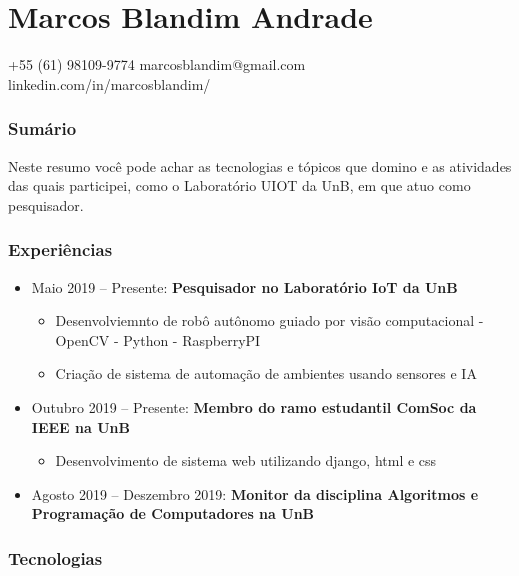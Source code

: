\documentclass{tccv_full}
\begin{document}
\part{Marcos Blandim Andrade}
{+55 (61) 98109-9774}
{marcosblandim@gmail.com}
{linkedin.com/in/marcosblandim/}


\vspace{0.5cm}

\section{Sumário}

Neste resumo você pode achar as tecnologias e tópicos que domino e as atividades das quais participei, como o Laboratório UIOT da UnB, em que atuo como pesquisador.

\section{Experiências}
\begin{itemize}
	\item{\large Maio 2019 -- Presente:	\textbf{Pesquisador no Laboratório IoT da UnB}}
	\begin{itemize}
		\item \textsf{Desenvolviemnto de robô autônomo guiado por visão computacional}
		{\small
			\subitem - OpenCV
			\subitem - Python
			\subitem - RaspberryPI
		}
		\item \textsf{Criação de sistema de automação de ambientes usando sensores e IA}
	\end{itemize}
	\vspace{0.3cm}
	\item{\large Outubro 2019 -- Presente:	\textbf{Membro do ramo estudantil ComSoc da IEEE na UnB}}
	\begin{itemize}
	    \item \textsf{Desenvolvimento de sistema web utilizando django, html e css}
	\end{itemize}
	\vspace{0.3cm}
	\item{\large Agosto 2019 -- Deszembro 2019:	\textbf{Monitor da disciplina Algoritmos e Programação de Computadores na UnB}}
\end{itemize}

\section{Tecnologias}
\end{document}
